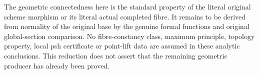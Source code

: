 \begin{remark}
\label{rmk:fc-analytic-step-geometric-frontier}
The geometric connectedness here is the standard property of the literal
original scheme morphism or its literal actual completed fibre. It remains
to be derived from normality of the original base by the genuine formal
functions and original global-section comparison. No fibre-constancy class,
maximum principle, topology property, local psh certificate or point-lift
data are assumed in these analytic conclusions. This reduction does not
assert that the remaining geometric producer has already been proved.
\end{remark}
